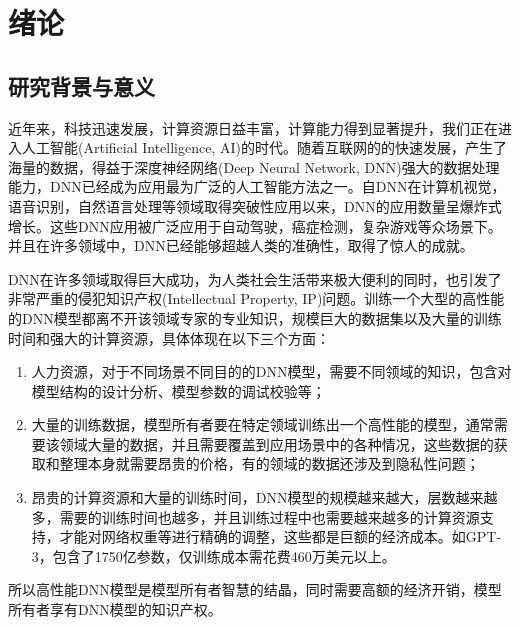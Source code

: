 
\chapter{绪论}
\label{1}


\section{研究背景与意义}

近年来，科技迅速发展，计算资源日益丰富，计算能力得到显著提升，我们正在进入人工智能(Artificial Intelligence, AI)\cite{winston1984artificial}的时代。随着互联网的的快速发展，产生了海量的数据，得益于深度神经网络(Deep Neural Network, DNN)\cite{sze2017efficient}强大的数据处理能力，DNN已经成为应用最为广泛的人工智能方法之一。自DNN在计算机视觉\cite{he2016identity,cortes2015advances,simonyan2014very}，语音识别\cite{nassif2019speech}，自然语言处理\cite{collobert2011natural,wu2016google,xiong2016achieving}等领域取得突破性应用以来，DNN的应用数量呈爆炸式增长。这些DNN应用被广泛应用于自动驾驶\cite{chen2015deepdriving}，癌症检测\cite{esteva2017dermatologist}，复杂游戏\cite{silver2017mastering}等众场景下。并且在许多领域中，DNN已经能够超越人类的准确性，取得了惊人的成就。

DNN在许多领域取得巨大成功，为人类社会生活带来极大便利的同时，也引发了非常严重的侵犯知识产权(Intellectual Property, IP)问题。训练一个大型的高性能的DNN模型都离不开该领域专家的专业知识，规模巨大的数据集以及大量的训练时间和强大的计算资源，具体体现在以下三个方面：

\begin{enumerate}
	\renewcommand{\labelenumi}{\theenumi)}
	\item 人力资源，对于不同场景不同目的的DNN模型，需要不同领域的知识，包含对模型结构的设计分析、模型参数的调试校验等；
	\item 大量的训练数据，模型所有者要在特定领域训练出一个高性能的模型，通常需要该领域大量的数据，并且需要覆盖到应用场景中的各种情况，这些数据的获取和整理本身就需要昂贵的价格，有的领域的数据还涉及到隐私性问题；
	\item 昂贵的计算资源和大量的训练时间，DNN模型的规模越来越大，层数越来越多，需要的训练时间也越多，并且训练过程中也需要越来越多的计算资源支持，才能对网络权重等进行精确的调整，这些都是巨额的经济成本。如GPT-3\cite{brown2020language}，包含了1750亿参数，仅训练成本需花费460万美元以上。
\end{enumerate}

所以高性能DNN模型是模型所有者智慧的结晶，同时需要高额的经济开销，模型所有者享有DNN模型的知识产权\cite{chen2018performance,darvish2019deepsigns}。

